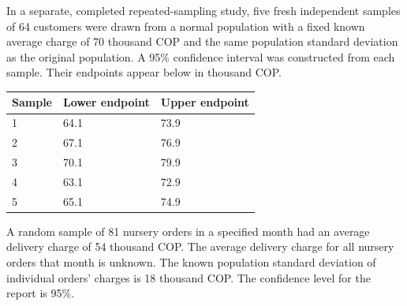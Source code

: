 In a separate, completed repeated-sampling study, five fresh independent samples of 64 customers were drawn from a normal population with a fixed known average charge of 70 thousand COP and the same population standard deviation as the original population. A 95\% confidence interval was constructed from each sample. Their endpoints appear below in thousand COP.

\begin{center}\begin{tabular}{@{}lll@{}}\toprule
Sample & Lower endpoint & Upper endpoint\\\midrule
1 & 64.1 & 73.9\\
2 & 67.1 & 76.9\\
3 & 70.1 & 79.9\\
4 & 63.1 & 72.9\\
5 & 65.1 & 74.9\\
\bottomrule\end{tabular}\end{center}


\BlankInformationTable

\clearpage
{}


\vfill


\clearpage
{}
A random sample of 81 nursery orders in a specified month had an average delivery charge of 54 thousand COP. The average delivery charge for all nursery orders that month is unknown. The known population standard deviation of individual orders' charges is 18 thousand COP. The confidence level for the report is 95\%.

